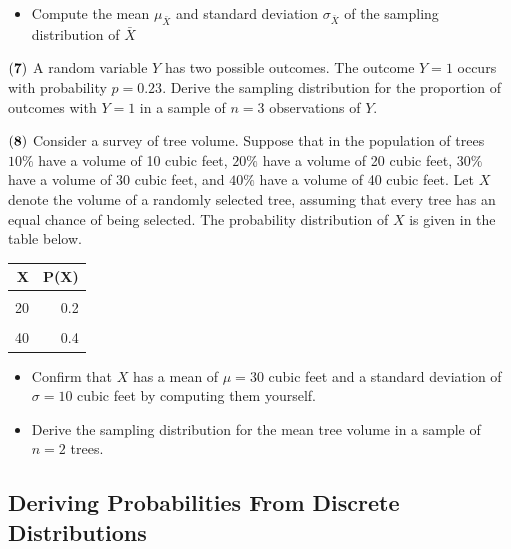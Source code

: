 \documentclass[
]{article}
\providecommand{\tightlist}{%
  \setlength{\itemsep}{0pt}\setlength{\parskip}{0pt}}
\begin{document}
\begin{itemize}
\tightlist
\item
  Compute the mean \(\mu_{\bar{X}}\) and standard deviation
  \(\sigma_{\bar{X}}\) of the sampling distribution of \(\bar{X}\)
\end{itemize}

\(\bf (7)\) A random variable \(Y\) has two possible outcomes. The
outcome \(Y = 1\) occurs with probability \(p = 0.23\). Derive the
sampling distribution for the proportion of outcomes with \(Y = 1\) in a
sample of \(n = 3\) observations of \(Y\).

\(\bf (8)\) Consider a survey of tree volume. Suppose that in the
population of trees \(10\%\) have a volume of 10 cubic feet, \(20\%\)
have a volume of 20 cubic feet, \(30\%\) have a volume of 30 cubic feet,
and \(40\%\) have a volume of 40 cubic feet. Let \(X\) denote the volume
of a randomly selected tree, assuming that every tree has an equal
chance of being selected. The probability distribution of \(X\) is given
in the table below.

\begin{table}[H]
\centering\centering
\begin{tabular}{rr}
\toprule
X & P(X)\\
\midrule
\cellcolor{gray!10}{10} & \cellcolor{gray!10}{0.1}\\
20 & 0.2\\
\cellcolor{gray!10}{30} & \cellcolor{gray!10}{0.3}\\
40 & 0.4\\
\bottomrule
\end{tabular}
\end{table}

\begin{itemize}
\tightlist
\item
  Confirm that \(X\) has a mean of \(\mu = 30\) cubic feet and a
  standard deviation of \(\sigma = 10\) cubic feet by computing them
  yourself.
\end{itemize}

\begin{itemize}
\tightlist
\item
  Derive the sampling distribution for the mean tree volume in a sample
  of \(n = 2\) trees.
\end{itemize}

\subsection{Deriving Probabilities From Discrete
Distributions}\label{deriving-probabilities-from-discrete-distributions}
\end{document}
